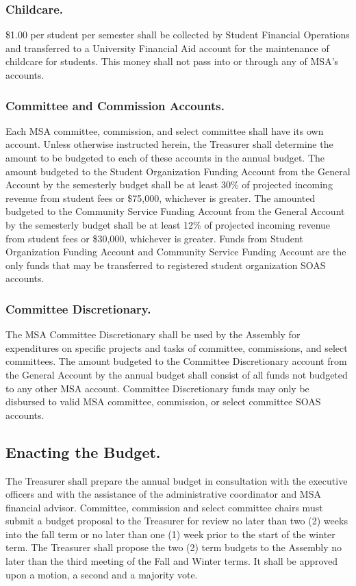 \subsubsection{Childcare.}
\$1.00 per student per semester shall be collected by Student Financial Operations and transferred to a University Financial Aid account for the maintenance of childcare for students.  This money shall not pass into or through any of MSA's accounts.

\subsubsection{Committee and Commission Accounts.}
Each MSA committee, commission, and select committee shall have its own account.  Unless otherwise instructed herein, the Treasurer shall determine the amount to be budgeted to each of these accounts in the annual budget.
The amount budgeted to the Student Organization Funding Account from the General Account by the semesterly budget shall be at least 30\% of projected incoming revenue from student fees or \$75,000, whichever is greater.
The amounted budgeted to the Community Service Funding Account from the General Account by the semesterly budget shall be at least 12\% of projected incoming revenue from student fees or \$30,000, whichever is greater.
\subsubsubsection{}
Funds from Student Organization Funding Account and Community Service Funding Account are the only funds that may be transferred to registered student organization SOAS accounts.

\subsubsection{Committee Discretionary.}
The MSA Committee Discretionary shall be used by the Assembly for expenditures on specific projects and tasks of committee, commissions, and select committees. The amount budgeted to the Committee Discretionary account from the General Account by the annual budget shall consist of all funds not budgeted to any other MSA account. Committee Discretionary funds may only be disbursed to valid MSA committee, commission, or select committee SOAS accounts.

\subsection{Enacting the Budget.}
The Treasurer shall prepare the annual budget in consultation with the executive officers and with the assistance of the administrative coordinator and MSA financial advisor. Committee, commission and select committee chairs must submit a budget proposal to the Treasurer for review no later than two (2) weeks into the fall term or no later than one (1) week prior to the start of the winter term. The Treasurer shall propose the two (2) term budgets to the Assembly no later than the third meeting of the Fall and Winter terms. It shall be approved upon a motion, a second and a majority vote.

